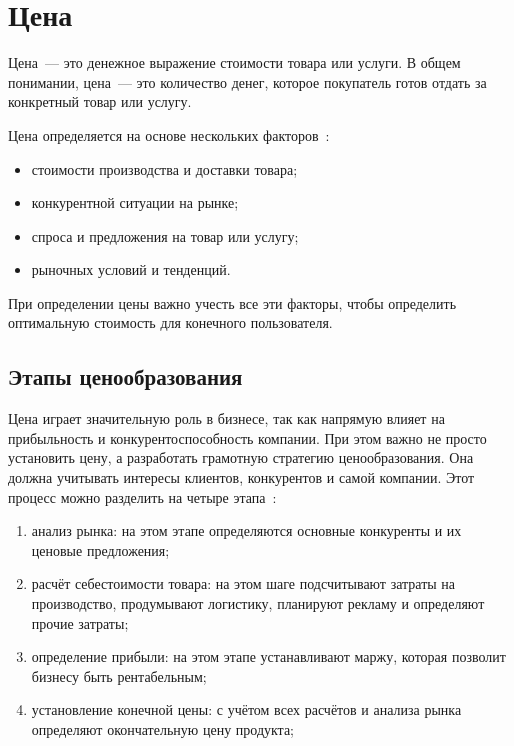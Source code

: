 \chapter{Цена}

Цена~--- это денежное выражение стоимости товара или услуги. 
В общем понимании, цена~--- это количество денег, которое покупатель готов отдать за конкретный товар или услугу.

Цена определяется на основе нескольких факторов~\cite{cost1}:
\begin{itemize}
	\item стоимости производства и доставки товара;
	\item конкурентной ситуации на рынке;
	\item спроса и предложения на товар или услугу;
	\item рыночных условий и тенденций.
\end{itemize}

При определении цены важно учесть все эти факторы, чтобы определить оптимальную стоимость для конечного пользователя.

\section{Этапы ценообразования}
Цена играет значительную роль в бизнесе, так как напрямую влияет на прибыльность и конкурентоспособность компании. 
При этом важно не просто установить цену, а разработать грамотную стратегию ценообразования. 
Она должна учитывать интересы клиентов, конкурентов и самой компании. 
Этот процесс можно разделить на четыре этапа~\cite{cost2}:
\begin{enumerate}
	\item анализ рынка: на этом этапе определяются основные конкуренты и их ценовые предложения;
	\item расчёт себестоимости товара: на этом шаге подсчитывают затраты на производство, продумывают логистику, планируют рекламу и определяют прочие затраты;
	\item определение прибыли: на этом этапе устанавливают маржу, которая позволит бизнесу быть рентабельным;
	\item установление конечной цены: с учётом всех расчётов и анализа рынка определяют окончательную цену продукта;
\end{enumerate}

